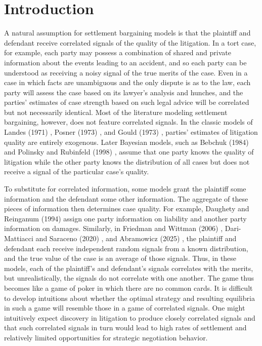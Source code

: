 \documentclass{article}
\begin{document}
\section{Introduction}

A natural assumption for settlement bargaining models is that the plaintiff and defendant receive correlated signals of the quality of the litigation. In a tort case, for example, each party may possess a combination of shared and private information about the events leading to an accident, and so each party can be understood as receiving a noisy signal of the true merits of the case. Even in a case in which facts are unambiguous and the only dispute is as to the law, each party will assess the case based on its lawyer's analysis and hunches, and the parties' estimates of case strength based on such legal advice will be correlated but not necessarily identical. Most of the literature modeling settlement bargaining, however, does not feature correlated signals. In the classic models of Landes (1971) \cite{landes}, Posner (1973) \cite{posner}, and Gould (1973) \cite{gould}, parties' estimates of litigation quality are entirely exogenous. Later Bayesian models, such as Bebchuk (1984) \cite{bebchuk84} and Polinsky and Rubinfeld (1998) \cite{polinskyrubinfeld}, assume that one party knows the quality of litigation while the other party knows the distribution of all cases but does not receive a signal of the particular case's quality. 

To substitute for correlated information, some models grant the plaintiff some information and the defendant some other information. The aggregate of these pieces of information then determines case quality. For example, Daughety and Reinganum (1994) \cite{daughetyreinganum1994} assign one party information on liability and another party information on damages. Similarly, in Friedman and Wittman (2006) \cite{friedmanwittman}, Dari-Mattiacci and Saraceno (2020) \cite{darimatiaccisaraceno}, and Abramowicz (2025) \cite{abramowicz}, the plaintiff and defendant each receive independent random signals from a known distribution, and the true value of the case is an average of those signals. Thus, in these models, each of the plaintiff's and defendant's signals correlates with the merits, but unrealistically, the signals do not correlate with one another. The game thus becomes like a game of poker in which there are no common cards. It is difficult to develop intuitions about whether the optimal strategy and resulting equilibria in such a game will resemble those in a game of correlated signals. One might intuitively expect discovery in litigation to produce closely correlated signals and that such correlated signals in turn would lead to high rates of settlement and relatively limited opportunities for strategic negotiation behavior.  
\end{document}
